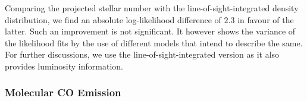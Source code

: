 \documentclass[doublespace,nopageskip]{VTthesis} %
\newcommand{\mrm}[1]{\mathrm{#1}}
\begin{document}



Comparing the projected stellar number with the line-of-sight-integrated density distribution, we find an absolute log-likelihood difference of $2.3$ in favour of the latter.
%
Such an improvement is not significant.
%
It however shows the variance of the likelihood fits by the use of different models that intend to describe the same.
%
For further discussions, we use the line-of-sight-integrated version as it also provides luminosity information.


\subsubsection{Molecular CO Emission}
\end{document}

